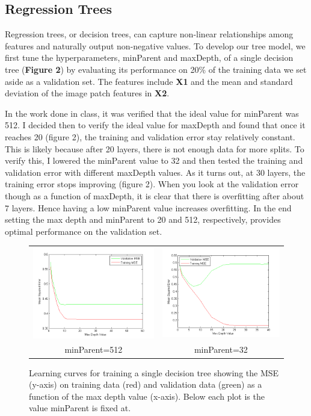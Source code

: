 \documentclass[12pt] {article}
\renewcommand{\baselinestretch}{1.2} %
\begin{document}
\subsection{Regression Trees}
Regression trees, or decision trees, can capture non-linear relationships among features and naturally output non-negative values. To develop our tree model, we first tune the hyperparameters, minParent and maxDepth, of a single decision tree (\textbf{Figure 2}) by evaluating its performance on 20\% of the training data we set aside as a validation set. The features include \textbf{X1} and the mean and standard deviation of the image patch features in \textbf{X2}.

In the work done in class, it was verified that the ideal value for minParent was 512. I decided then to verify the ideal value for maxDepth and found that once it reaches 20 (figure 2), the training and validation error stay relatively constant. This is likely because after 20 layers, there is not enough data for more splits. To verify this, I lowered the minParent value to 32 and then tested the training and validation error with different maxDepth values. As it turns out, at 30 layers, the training error stops improving (figure 2). When you look at the validation error though as a function of maxDepth, it is clear that there is overfitting after about 7 layers. Hence having a low minParent value increases overfitting. In the end setting the max depth and minParent to 20 and 512, respectively, provides optimal performance on the validation set.
\renewcommand{\baselinestretch}{1.0} %
\begin{figure}[h!] \centering
\begin{tabular}{cc}
\includegraphics[width=.45\textwidth]{figdir/maxDepthVersusMSE.png} &
\includegraphics[width=.45\textwidth]{figdir/maxDepthVersusMSE2.png} \\
minParent=512 & minParent=32 \\
\end{tabular}
\caption{Learning curves for training a single decision tree showing the MSE (y-axis) on training data (red) and validation data (green) as a function of the max depth value (x-axis). Below each plot is the value minParent is fixed at.}
\end{figure}
\end{document}
